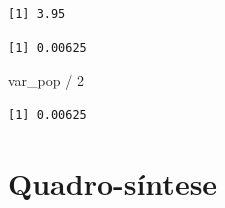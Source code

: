 \documentclass[
  letterpaper,
  DIV=11,
  numbers=noendperiod]{scrreprt}
\newenvironment{Shaded}{\begin{snugshade}}{\end{snugshade}}
\newcommand{\DecValTok}[1]{\textcolor[rgb]{0.68,0.00,0.00}{#1}}
\newcommand{\FunctionTok}[1]{\textcolor[rgb]{0.28,0.35,0.67}{#1}}
\newcommand{\NormalTok}[1]{\textcolor[rgb]{0.00,0.23,0.31}{#1}}
\newcommand{\OtherTok}[1]{\textcolor[rgb]{0.00,0.23,0.31}{#1}}
\newcommand{\SpecialCharTok}[1]{\textcolor[rgb]{0.37,0.37,0.37}{#1}}
\begin{document}
\begin{Shaded}
\end{Shaded}

\begin{verbatim}
[1] 3.95
\end{verbatim}

\begin{Shaded}
\end{Shaded}

\begin{verbatim}
[1] 0.00625
\end{verbatim}

\begin{Shaded}
\begin{Highlighting}[]
\NormalTok{var\_pop }\SpecialCharTok{/} \DecValTok{2}
\end{Highlighting}
\end{Shaded}

\begin{verbatim}
[1] 0.00625
\end{verbatim}

\section{Quadro-síntese}\label{quadro-suxedntese}
\end{document}
